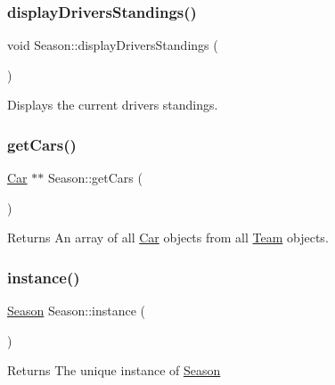 \subsubsection{\texorpdfstring{display\+Drivers\+Standings()}{displayDriversStandings()}}
{\footnotesize\ttfamily void Season\+::display\+Drivers\+Standings (\begin{DoxyParamCaption}{ }\end{DoxyParamCaption})\hspace{0.3cm}{\ttfamily [private]}}

Displays the current drivers\textquotesingle{} standings. \mbox{\label{classSeason_aa51c303aa0ba522f2e95d263995f7791}} 
\subsubsection{\texorpdfstring{get\+Cars()}{getCars()}}
{\footnotesize\ttfamily \hyperlink{classCar}{Car} $\ast$$\ast$ Season\+::get\+Cars (\begin{DoxyParamCaption}{ }\end{DoxyParamCaption})\hspace{0.3cm}{\ttfamily [private]}}

\begin{DoxyReturn}{Returns}
An array of all \hyperlink{classCar}{Car} objects from all \hyperlink{classTeam}{Team} objects. 
\end{DoxyReturn}
\mbox{\label{classSeason_a6f0fa8d25bd43abc987a25e6f6936fd7}} 
\subsubsection{\texorpdfstring{instance()}{instance()}}
{\footnotesize\ttfamily \hyperlink{classSeason}{Season} Season\+::instance (\begin{DoxyParamCaption}{ }\end{DoxyParamCaption})\hspace{0.3cm}{\ttfamily [static]}}

\begin{DoxyReturn}{Returns}
The unique instance of \hyperlink{classSeason}{Season} 
\end{DoxyReturn}
\mbox{\label{classSeason_ad5455ffe0999020706d9068b43baef91}} 
